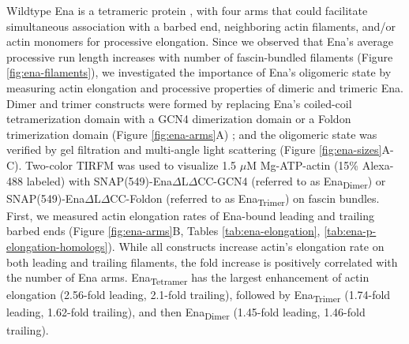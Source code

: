Wildtype Ena is a tetrameric protein \citep{kuhnel_vasp_2004, winkelman_ena/vasp_2014}, with four arms that could facilitate simultaneous association with a barbed end, neighboring actin filaments, and/or actin monomers for processive elongation. Since we observed that Ena's average processive run length increases with number of fascin-bundled filaments (Figure \ref{fig:ena-filaments}), we investigated the importance of Ena's oligomeric state by measuring actin elongation and processive properties of dimeric and trimeric Ena. Dimer and trimer constructs were formed by replacing Ena's coiled-coil tetramerization domain with a GCN4 dimerization domain \citep{harbury_switch_1993} or a Foldon trimerization domain (Figure \ref{fig:ena-arms}A) \citep{guthe_very_2004, papanikolopoulou_formation_2004}; and the oligomeric state was verified by gel filtration and multi-angle light scattering (Figure \ref{fig:ena-sizes}A-C). Two-color TIRFM was used to visualize 1.5 $\mu$M Mg-ATP-actin (15\% Alexa-488 labeled) with SNAP(549)-Ena$\Delta$L$\Delta$CC-GCN4 (referred to as Ena\textsubscript{Dimer}) or SNAP(549)-Ena$\Delta$L$\Delta$CC-Foldon (referred to as Ena\textsubscript{Trimer}) on fascin bundles. First, we measured actin elongation rates of Ena-bound leading and trailing barbed ends (Figure \ref{fig:ena-arms}B, Tables \ref{tab:ena-elongation}, \ref{tab:ena-p-elongation-homologs}). While all constructs increase actin's elongation rate on both leading and trailing filaments, the fold increase is positively correlated with the number of Ena arms. Ena\textsubscript{Tetramer} has the largest enhancement of actin elongation (2.56-fold leading, 2.1-fold trailing), followed by Ena\textsubscript{Trimer} (1.74-fold leading, 1.62-fold trailing), and then Ena\textsubscript{Dimer} (1.45-fold leading, 1.46-fold trailing). 

